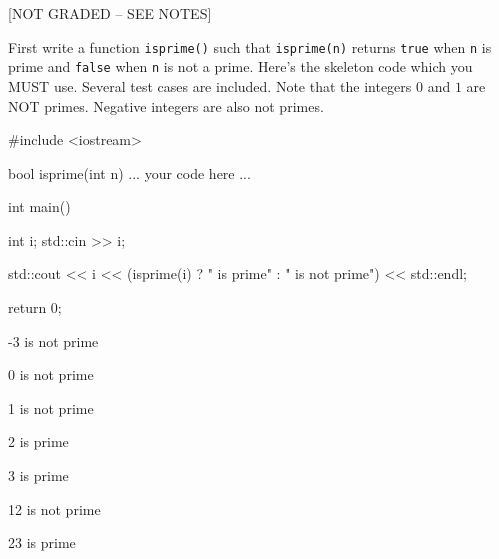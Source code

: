 [NOT GRADED -- SEE NOTES]

First write a function \verb!isprime()! such that \verb!isprime(n)! returns
\verb!true! when \verb!n! is prime and \verb!false! when \verb!n! is not a
prime. Here's the skeleton code which you MUST use. Several test cases are
included. Note that the integers $0$ and $1$ are NOT primes. Negative integers
are also not primes.
\begin{console}
#include <iostream>


bool isprime(int n)
{
    ... your code here ...
}


int main()
{
    int i;
    std::cin >> i;

    std::cout << i << (isprime(i) ? " is prime" : " is not prime") 
              << std::endl;

    return 0;
}
\end{console}

\resett
\nextt
\begin{console}[frame=single, commandchars=\\\{\}]
-3 is not prime 
\end{console}

\nextt
\begin{console}[frame=single, commandchars=\\\{\}]
0 is not prime 
\end{console}

\nextt
\begin{console}[frame=single, commandchars=\\\{\}]
1 is not prime 
\end{console}

\nextt
\begin{console}[frame=single, commandchars=\\\{\}]
2 is prime 
\end{console}

\nextt
\begin{console}[frame=single, commandchars=\\\{\}]
3 is prime 
\end{console}

\nextt
\begin{console}[frame=single, commandchars=\\\{\}]
12 is not prime 
\end{console}

\nextt
\begin{console}[frame=single, commandchars=\\\{\}]
23 is prime 
\end{console}
